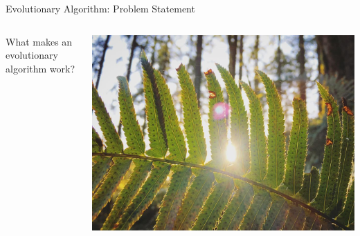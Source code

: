 \begin{frame}{Evolutionary Algorithm: Problem Statement}
  
  \begin{columns}
\begin{column}{0.6\textwidth}
 What makes an evolutionary algorithm work?
\end{column}
\begin{column}{0.4\textwidth}
\begin{center}
\includegraphics[width=\textwidth,trim={7cm 0 13cm 0},clip]{img/sunfern}
\end{center}
\end{column}
\end{columns}
 
\end{frame}